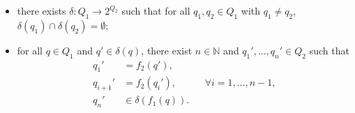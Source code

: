\documentclass[letterpaper, reqno,11pt]{article}
\newcommand{\NN}{\mathbb{N}}
\begin{document}
\begin{enumerate}
\begin{itemize}
        \item there exists $\delta : Q_1 \to 2^{Q_2}$ such that for all $q_1, q_2 \in Q_1$ with $q_1 \neq q_2$, $\delta\left(q_1\right) \cap \delta\left(q_2\right) = \emptyset$;
        \item for all $q \in Q_1$ and $q' \in \delta(q)$, there exist $n \in \NN$ and $q_1', \ldots, q_n' \in Q_2$ such that
        \begin{align*}
            q_1' &= f_2\left(q'\right), \\
            q_{i + 1}' &= f_2\left(q_i'\right), && \forall i = 1, \ldots, n - 1, \\
            q_n' &\in \delta\left(f_1(q)\right).
        \end{align*}
    \end{itemize}
\end{enumerate}
\end{document}

